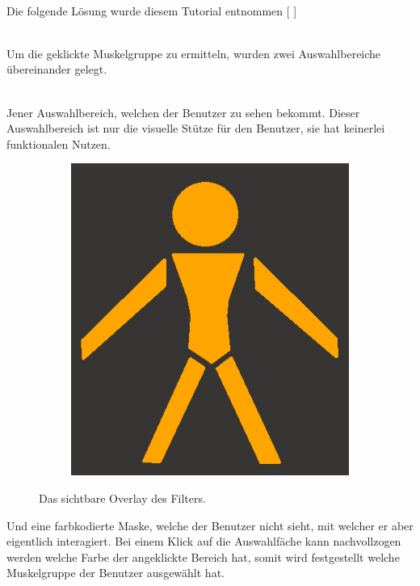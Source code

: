 \documentclass[FIPLY_base.tex]{subfiles}
\begin{document}
\ \\
Die folgende Lösung wurde diesem Tutorial entnommen  [ \cite{ueClickableAreas}]

\ \\
Um die geklickte Muskelgruppe zu ermitteln, wurden zwei Auswahlbereiche übereinander gelegt.

\ \\
Jener Auswahlbereich, welchen der Benutzer zu sehen bekommt.
Dieser Auswahlbereich ist nur die visuelle Stütze für den Benutzer, sie hat keinerlei funktionalen Nutzen.

\begin{figure}[H]
	\begin{subfigure}[b]{0.3\textwidth}
	\includegraphics[scale=0.3]{img/Uebungskatalog_filter_overlay}
	\end{subfigure}
	\hfil
	\caption{Das sichtbare Overlay des Filters.}
\end{figure}


Und eine farbkodierte Maske, welche der Benutzer nicht sieht, mit welcher er aber eigentlich interagiert.
Bei einem Klick auf die Auswahlfäche kann nachvollzogen werden welche Farbe der angeklickte Bereich hat, somit wird festgestellt welche Muskelgruppe der Benutzer ausgewählt hat.
\end{document}
